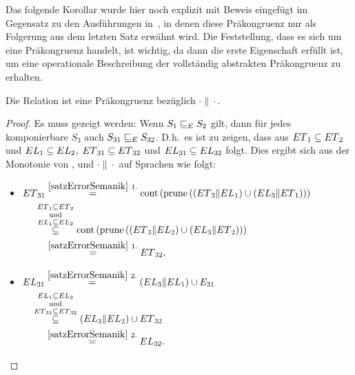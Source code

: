 Das folgende Korollar wurde hier noch explizit mit Beweis eingefügt im
Gegensatz zu den Ausführungen in~\cite{Vogler2014EIO}, in denen diese
Präkongruenz nur als Folgerung aus dem letzten Satz erwähnt wird. Die
Feststellung, dass es sich um eine Präkongruenz handelt, ist wichtig, da
dann die erste Eigenschaft erfüllt ist, um eine operationale Beschreibung der
vollständig abstrakten Präkongruenz \ECRel{} zu erhalten.

\begin{kor}
\label{propPraekongruenz}
  Die Relation \ERel{} ist eine Präkongruenz bezüglich $\cdot\|\cdot$.
\end{kor}

\begin{proof}
  Es muss gezeigt werden: Wenn $S_1\sqsubseteq _E S_2$ gilt, dann für jedes
  komponierbare $S_3$ auch $S_{31}\sqsubseteq _E S_{32}$. D.h.\ es ist zu zeigen,
  dass aus $ET{}_1\subseteq ET{}_2$ und $EL{}_1\subseteq EL{}_2$,
  $ET{}_{31}\subseteq ET{}_{32}$ und $EL{}_{31}\subseteq
  EL{}_{32}$ folgt. Dies ergibt sich aus der Monotonie von \cont{},
  \prune{} und $\cdot \|\cdot$ auf Sprachen wie folgt:\\
  \begin{itemize}
    \item $\begin{aligned}[t]
        \ET{}_{31} &\overset{\ref{satzErrorSemanik}~1.}{=}
      \cont{}\left(\prune{}\left(\left(\ET{}_3\|\EL{}_1\right)\cup
          \left(\EL{}_3\|\ET{}_1\right)\right)\right)\\
      &\hspace{-0.4cm}\overset{\ET{}_1\subseteq
    \ET{}_2}{\overset{\mathrm{und}}{\overset{\EL{}_1\subseteq \EL{}_2}{\subseteq}}}
    \cont{}\left(\prune{}\left(\left(\ET{}_3\|\EL{}_2\right)\cup
        \left(\EL{}_3\|\ET{}_2\right)\right)\right)\\
    &\overset{\ref{satzErrorSemanik}~1.}{=} \ET{}_{32},
    \end{aligned}$
    \item $\begin{aligned}[t]
        \EL{}_{31} &\overset{\ref{satzErrorSemanik}~2.}{=} (\EL{}_3\|\EL{}_1)\cup
        E_{31}\\
        &\hspace{-0.5cm}\overset{\EL{}_1\subseteq
      \EL{}_2}{\overset{\mathrm{und}}{\overset{\ET{}_{31}\subseteq
      \ET{}_{32}}{\subseteq}}} (\EL{}_3\|\EL{}_2)\cup \ET{}_{32}\\
      &\overset{\ref{satzErrorSemanik}~2.}{=} \EL{}_{32}.
    \end{aligned}$
  \end{itemize}
\end{proof}

